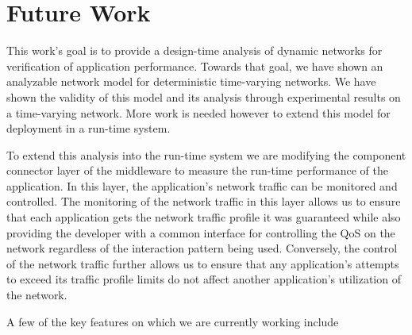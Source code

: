 \chapter{Future Work}
\label{ch:future_work}



This work's goal is to provide a design-time analysis of dynamic networks for verification of application performance.  Towards that goal, we have shown an analyzable network model for deterministic time-varying networks.  We have shown the validity of this model and its analysis through experimental results on a time-varying network.  More work is needed however to extend this model for deployment in a run-time system.  

To extend this analysis into the run-time system we are modifying the component connector layer of the middleware to measure the run-time performance of the application. In this layer, the application's network traffic can be monitored and controlled. The monitoring of the network traffic in this layer allows us to ensure that each application gets the network traffic profile it was guaranteed while also providing the developer with a common interface for controlling the QoS on the network regardless of the interaction pattern being used.  Conversely, the control of the network traffic further allows us to ensure that any application's attempts to exceed its traffic profile limits do not affect another application's utilization of the network.  

A few of the key features on which we are currently working include 

